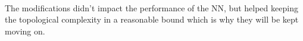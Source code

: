 \begin{figure}[H]
\begin{adjustbox}{valign=c,margin=-5mm 0pt 0pt 0pt}
\begin{minipage}{1.1\textwidth}
\begin{subfigure}[b]{0.45\textwidth}
                    \begin{center}
                    \end{center}
                \end{subfigure}

            \end{minipage}
        \end{adjustbox}
        \label{fig:performances-1}
    \end{figure}
    \\
    The modifications didn't impact the performance of the NN, but helped keeping the topological complexity in a reasonable bound which is why they will be kept moving on.


